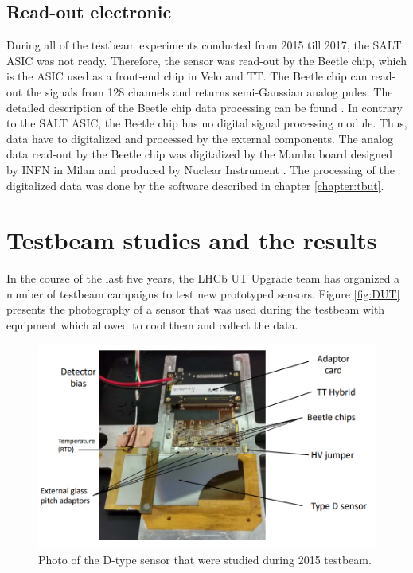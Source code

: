 \subsection{Read-out electronic}
During all of the testbeam experiments conducted from 2015 till 2017, the SALT ASIC was not ready. Therefore, the sensor was read-out by the Beetle chip, which is the ASIC used as a front-end chip in Velo and TT. The Beetle chip can read-out the signals from 128 channels and returns semi-Gaussian analog pules.  The detailed description of the Beetle chip data processing can be found \cite{Beetle}.  In contrary to the SALT ASIC, the Beetle chip has no digital signal processing module. Thus, data have to digitalized and processed by the external components.  
The analog data read-out by the Beetle chip was digitalized by the Mamba board designed by INFN in Milan and produced by Nuclear Instrument \cite{}.   
The processing of the digitalized data was done by the software described in chapter \ref{chapter:tbut}. 

\section{Testbeam studies and the results}
In the course of the last five years, the LHCb UT Upgrade team has organized a number of testbeam campaigns to test new prototyped sensors. Figure \ref{fig:DUT} presents the photography of a sensor that was used during the testbeam with equipment which allowed to cool
them and collect the data. 

\begin{figure}
\centering
\includegraphics{figures/Sensor_photo.PNG}
\caption{Photo of the D-type sensor that were studied during 2015 testbeam.}
\label{fig:telescope_tracks}
\end{figure}



